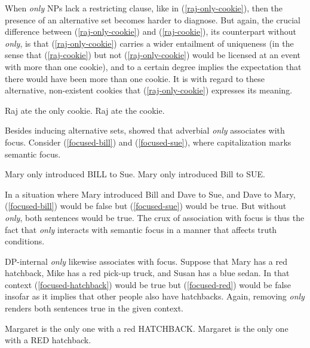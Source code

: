 When \textit{only} NPs lack a restricting clause, like in (\ref{raj-only-cookie}), then the presence of an alternative set becomes harder to diagnose. But again, the crucial difference between (\ref{raj-only-cookie}) and (\ref{raj-cookie}), its counterpart without \textit{only}, is that (\ref{raj-only-cookie}) carries a wider entailment of uniqueness (in the sense that (\ref{raj-cookie}) but not (\ref{raj-only-cookie}) would be licensed at an event with more than one cookie), and to a certain degree implies the expectation that there would have been more than one cookie. It is with regard to these alternative, non-existent cookies that (\ref{raj-only-cookie}) expresses its meaning.

\begin{exe}
	\ex \label{raj-only-cookie} Raj ate the only cookie.
	\ex \label{raj-cookie} Raj ate the cookie.
\end{exe}

Besides inducing alternative sets, \citet{rooth85} showed that adverbial \textit{only} associates with focus. Consider (\ref{focused-bill}) and (\ref{focused-sue}), where capitalization marks semantic focus.

\begin{exe}
	\ex \label{focused-bill} Mary only introduced BILL to Sue.
	\ex \label{focused-sue} Mary only introduced Bill to SUE.
\end{exe}

In a situation where Mary introduced Bill and Dave to Sue, and Dave to Mary, (\ref{focused-bill}) would be false but (\ref{focused-sue}) would be true. But without \textit{only}, both sentences would be true. The crux of association with focus is thus the fact that \textit{only} interacts with semantic focus in a manner that affects truth conditions.

DP-internal \textit{only} likewise associates with focus. Suppose that Mary has a red hatchback, Mike has a red pick-up truck, and Susan has a blue sedan. In that context (\ref{focused-hatchback}) would be true but (\ref{focused-red}) would be false insofar as it implies that other people also have hatchbacks. Again, removing \textit{only} renders both sentences true in the given context.

\begin{exe}
	\ex \label{focused-hatchback} Margaret is the only one with a red HATCHBACK.
	\ex \label{focused-red} Margaret is the only one with a RED hatchback.
\end{exe}

